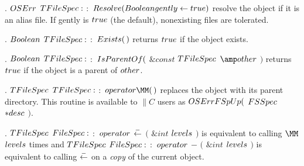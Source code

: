 \fi

.  \CD{}$\\{OSErr}$ $\\{TFileSpec}:$ $:$ $\\{Resolve}(\\{Boolean}\ %
\\{gently}\leftarrow\\{true})$\DC{} resolve the object if it is an alias file.
If gently is \CD{}$\\{true}$\DC{} (the default), nonexisting files are
tolerated.

\fi

. \CD{}$\\{Boolean}$ $\\{TFileSpec}:$ $:$ $\\{Exists}(\,)$\DC{} returns %
\CD{}$\\{true}$\DC{} if the object exists.

\fi

. \CD{}$\\{Boolean}$ $\\{TFileSpec}:$ $:$ $\\{IsParentOf}($ $\&{const}$ $%
\\{TFileSpec}$ ${\amp}\\{other}$ $)$\DC{} returns \CD{}$\\{true}$\DC{} if the
object is
a parent of \CD{}$\\{other}$\DC{}.

\fi

. \CD{}$\\{TFileSpec}$ $\\{TFileSpec}:$ $:$ $\\{operator}\MM(\,)$\DC{}
replaces the object with its parent directory.
This routine is available to \CD{}$\|C$\DC{} users as
\CD{}$\\{OSErr}\ \\{FSpUp}($ $\\{FSSpec}$ ${{*}}\\{desc}$ $)$\DC{}.

\fi

. \CD{}$\\{TFileSpec}$ $\\{FileSpec}:$ $:$ $\\{operator}$ $\buildrel-%
\over{\leftarrow}$ $($ $\&{int}$ $\\{levels}$ $)$\DC{} is equivalent to calling
\CD{}$\MM$\DC{}
\CD{}$\\{levels}$\DC{} times and \CD{}$\\{TFileSpec}$ $\\{FileSpec}:$ $:$ $%
\\{operator}$ $-$ $($ $\&{int}$ $\\{levels}$ $)$\DC{} is equivalent
to calling \CD{}$\buildrel-\over{\leftarrow}$\DC{} on a {\it copy} of the
current object.

